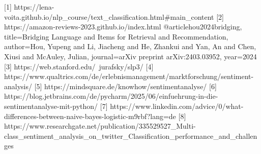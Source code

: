 [1] https://lena-voita.github.io/nlp_course/text_classification.html#main_content
[2] https://amazon-reviews-2023.github.io/index.html
@article{hou2024bridging,
  title={Bridging Language and Items for Retrieval and Recommendation},
  author={Hou, Yupeng and Li, Jiacheng and He, Zhankui and Yan, An and Chen, Xiusi and McAuley, Julian},
  journal={arXiv preprint arXiv:2403.03952},
  year={2024}
}
[3] https://web.stanford.edu/~jurafsky/slp3/
[4] https://www.qualtrics.com/de/erlebnismanagement/marktforschung/sentiment-analysis/
[5] https://mindsquare.de/knowhow/sentimentanalyse/
[6] https://blog.jetbrains.com/de/pycharm/2025/06/einfuehrung-in-die-sentimentanalyse-mit-python/
[7] https://www.linkedin.com/advice/0/what-differences-between-naive-bayes-logistic-m9rbf?lang=de
[8] https://www.researchgate.net/publication/335529527_Multi-class_sentiment_analysis_on_twitter_Classification_performance_and_challenges
